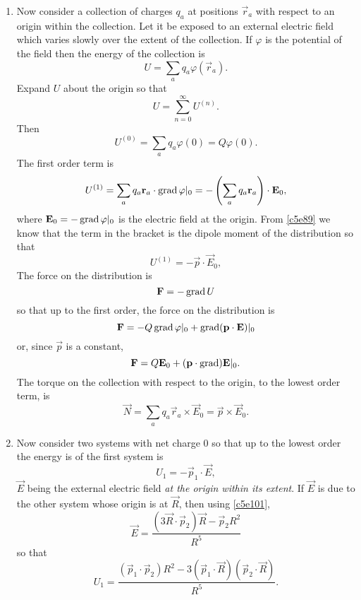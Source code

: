 \begin{enumerate}
\item Now consider a collection of charges $q_a$ at positions $\vec{r}_a$ with 
respect to an origin within the collection. Let it be exposed to an external 
electric field which varies slowly over the extent of the collection. If $\varphi$
is the potential of the field then the energy of the collection is
\begin{equation}\label{c5e117}
U = \sum_aq_a\varphi(\vec{r}_a).
\end{equation}
Expand $U$ about the origin so that
\begin{equation}\label{c5e118}
U = \sum_{n=0}^\infty U^{(n)}.
\end{equation}
Then 
\begin{equation}\label{c5e119}
U^{(0)} = \sum_a q_a\varphi(0) = Q\varphi(0).
\end{equation}
The first order term is
\[
U^{(1)} = \sum_a q_a\mathbf{r}_a\cdot\operatorname{grad}\varphi|_0 = 
-\left(\sum_a q_a\mathbf{r}_a\right)\cdot\mathbf{E}_0,
\]
where $\mathbf{E}_0 = -\operatorname{grad}\varphi|_0$ is the electric field at the origin. From 
\eqref{c5e89} we know that the term in the bracket is the dipole moment of the
distribution so that
\begin{equation}\label{c5e120}
U^{(1)} = -\vec{p}\cdot\vec{E}_0,
\end{equation}
The force on the distribution is
\begin{equation}\label{c5e121}
\mathbf{F} = -\operatorname{grad} U
\end{equation}
so that up to the first order, the force on the distribution is
\[
\mathbf{F} = -Q\operatorname{grad}\varphi|_0 + \operatorname{grad}(\mathbf{p}\cdot\mathbf{E})|_0
\]
or, since $\vec{p}$ is a constant,
\begin{equation}\label{c5e122}
\mathbf{F} = Q\mathbf{E}_0 + (\mathbf{p}\cdot\operatorname{grad})\mathbf{E}|_0.
\end{equation}
The torque on the collection with respect to the origin, to the lowest order term,
is
\begin{equation}\label{c5e123}
\vec{N} = \sum_aq_a\vec{r}_a\times\vec{E}_0  = \vec{p}\times\vec{E}_0.
\end{equation}

\item Now consider two systems with net charge $0$ so that up to the lowest order
the energy is of the first system is
\begin{equation}\label{c5e124}
U_1 = -\vec{p}_1\cdot\vec{E},
\end{equation}
$\vec{E}$ being the external electric field \emph{at the origin within its extent}.
If $\vec{E}$ is due to the other system whose origin is at $\vec{R}$, then using
\eqref{c5e101},
\[
\vec{E} = \frac{(3\vec{R}\cdot\vec{p}_2)\vec{R} - \vec{p}_2R^2}{R^5}
\]
so that
\begin{equation}\label{c5e125}
U_1 = \frac{(\vec{p}_1\cdot\vec{p}_2)R^2 - 3(\vec{p}_1\cdot\vec{R})(\vec{p}_2\cdot\vec{R})}{R^5}.
\end{equation}


\end{enumerate}
